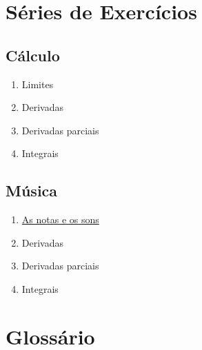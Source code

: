 \chapter{Séries de Exercícios}
    \section*[a:calculo]{Cálculo}%

    \begin{enumerate}[label=\Roman*]
        \item Limites
        \item Derivadas
        \item Derivadas parciais
        \item Integrais
    \end{enumerate}

    \section*[a:musica]{Música}%

    \begin{enumerate}[label=\Roman*]
        \item \hyperref[p:musica:1]{As notas e os sons} \Dotfill[.66em] \pageref{p:musica:1}
        \item Derivadas
        \item Derivadas parciais
        \item Integrais
    \end{enumerate}


\chapter{Glossário}

